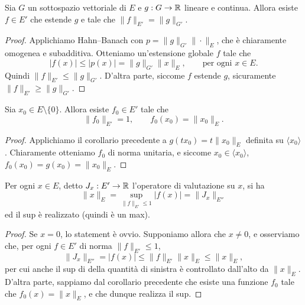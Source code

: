 \begin{corollary}
\label{cor:hahn_banach_ext}
	Sia $G$ un sottospazio vettoriale di $E$ e $g : G \to \mathbb{R}$ lineare e continua.
	Allora esiste $f \in E'$ che estende $g$ e tale che $\|f\|_{E'} = \|g\|_{G'}$.
\end{corollary}
\begin{proof}
	Applichiamo Hahn--Banach con $p = \|g\|_{G'} \|\cdot\|_E$, che è chiaramente omogenea e subadditiva. Otteniamo un'estensione globale $f$ tale che
	\begin{equation*}
		|f(x)| \leq |p(x)| = \|g\|_{G'}\|x\|_E, \qquad \text{per ogni $x \in E$}.
	\end{equation*}
	Quindi $\|f\|_{E'} \leq \|g\|_{G'}$.
	D'altra parte, siccome $f$ estende $g$, sicuramente $\|f\|_{E'} \geq \|g\|_{G'}$.
\end{proof}

\begin{corollary}
\label{cor:two_chap_1}
	Sia $x_0 \in E \setminus\{0\}$.
	Allora esiste $f_0 \in E'$ tale che
	\begin{equation*}
		\|f_0\|_{E'} = 1, \qquad f_0(x_0) = \|x_0\|_E.
	\end{equation*}
\end{corollary}
\begin{proof}
	Applichiamo il corollario precedente a $g(tx_0) = t\|x_0\|_E$ definita su $\langle x_0 \rangle$. Chiaramente otteniamo $f_0$ di norma unitaria, e siccome $x_0 \in \langle x_0 \rangle$, $f_0(x_0) = g(x_0) = \|x_0\|_E$.
\end{proof}

\begin{corollary}
	\label{cor:eval_norm}
		Per ogni $x \in E$, detto $J_x : E' \to \mathbb{R}$ l'operatore di valutazione su $x$, si ha
		\begin{equation*}
			\|x\|_E = \sup_{\|f\|_{E'} \leq 1} |f(x)| = \|J_x\|_{E''}
		\end{equation*}
		ed il sup è realizzato (quindi è un max).
	\end{corollary}
\begin{proof}
	Se $x=0$, lo statement è ovvio. Supponiamo allora che $x \neq 0$, e osserviamo che, per ogni $f \in E'$ di norma $\|f\|_{E'} \leq 1$,
	\begin{equation*}
		\|J_x\|_{E''} = |f(x)| \leq \|f\|_{E'}\|x\|_E \leq \|x\|_E,
	\end{equation*}
	per cui anche il sup di della quantità di sinistra è controllato dall'alto da $\|x\|_E$. D'altra parte, sappiamo dal corollario precedente che esiste una funzione $f_0$ tale che $f_0(x) = \|x\|_E$, e che dunque realizza il sup.
\end{proof}

